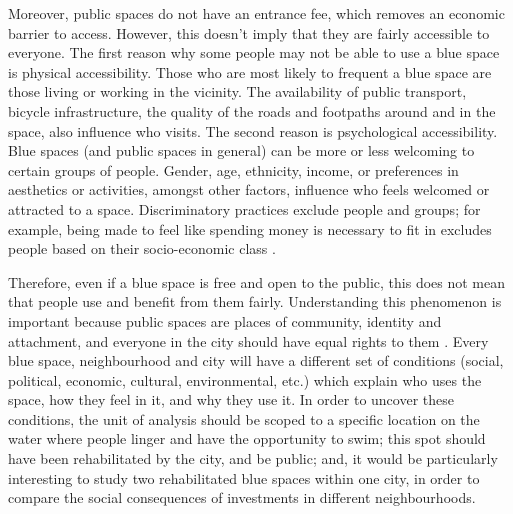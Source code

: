 \documentclass{article}
\begin{document}
Moreover, public spaces do not have an entrance fee, which removes an economic barrier to access. However, this doesn't imply that they are fairly accessible to everyone.
The first reason why some people may not be able to use a blue space is physical accessibility. Those who are most likely to frequent a blue space are those living or working in the vicinity. The availability of public transport, bicycle infrastructure, the quality of the roads and footpaths around and in the space, also influence who visits.
The second reason is psychological accessibility. Blue spaces (and public spaces in general) can be more or less welcoming to certain groups of people. Gender, age, ethnicity, income, or preferences in aesthetics or activities, amongst other factors, influence who feels welcomed or attracted to a space. Discriminatory practices exclude people and groups; for example, being made to feel like spending money is necessary to fit in excludes people based on their socio-economic class \parencite{wessells2014urban}.

Therefore, even if a blue space is free and open to the public, this does not mean that people use and benefit from them fairly. Understanding this phenomenon is important because public spaces are places of community, identity and attachment, and everyone in the city should have equal rights to them \parencite{agyeman2016trends}. Every blue space, neighbourhood and city will have a different set of conditions (social, political, economic, cultural, environmental, etc.) which explain who uses the space, how they feel in it, and why they use it. In order to uncover these conditions, the unit of analysis should be scoped to a specific location on the water where people linger and have the opportunity to swim; this spot should have been rehabilitated by the city, and be public; and, it would be particularly interesting to study two rehabilitated blue spaces within one city, in order to compare the social consequences of investments in different neighbourhoods.
\end{document}
